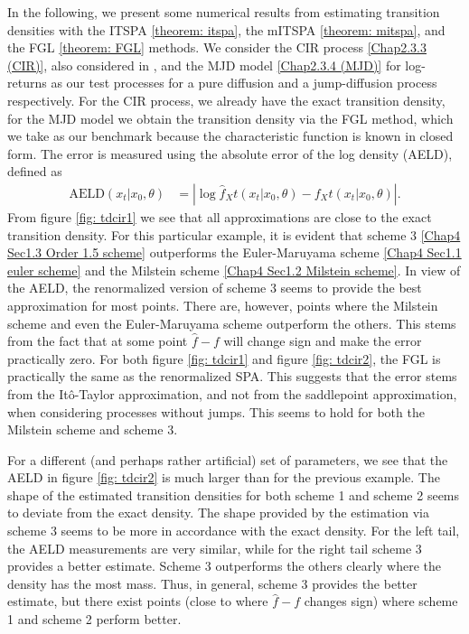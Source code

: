 In the following, we present some numerical results from estimating transition densities with the ITSPA \eqref{theorem: itspa}, the mITSPA \eqref{theorem: mitspa}, and the FGL \eqref{theorem: FGL} methods.
We consider the CIR process \eqref{Chap2.3.3 (CIR)}, also considered in \citet{preston2012approximation}, and the MJD model \eqref{Chap2.3.4 (MJD)} for log-returns as our test processes for a pure diffusion and a jump-diffusion process respectively.
For the CIR process, we already have the exact transition density, for the MJD model we obtain the transition density via the FGL method, which we take as our benchmark because the characteristic function is known in closed form.
The error is measured using the absolute error of the log density (AELD), defined as
\begin{align}
\text{AELD}(x_t|x_0,\theta)&=\left|\log\hat{f}_X{t}(x_t|x_0,\theta)-f_X{t}(x_t|x_0,\theta)\right|.
\end{align}
From figure %
\ref{fig: tdcir1}
we see that all approximations are close to the exact transition density.
For this particular example, it is evident that scheme 3 \eqref{Chap4 Sec1.3 Order 1.5 scheme} outperforms the Euler-Maruyama scheme \eqref{Chap4 Sec1.1 euler scheme} and the Milstein scheme \eqref{Chap4 Sec1.2 Milstein scheme}.
In view of the AELD, the renormalized version of scheme 3 seems to provide the best approximation for most points.
There are, however, points where the Milstein scheme and even the Euler-Maruyama scheme outperform the others.
This stems from the fact that at some point $\hat{f}-f$ will change sign and make the error practically zero.
For both figure \ref{fig: tdcir1} and figure \ref{fig: tdcir2}, the FGL is practically the same as the renormalized SPA.
This suggests that the error stems from the Itô-Taylor approximation, and not from the saddlepoint approximation, when considering processes without jumps.
This seems to hold for both the Milstein scheme and scheme 3.

For a different (and perhaps rather artificial) set of parameters, we see that the AELD in figure %
\ref{fig: tdcir2}
is much larger than for the previous example.
The shape of the estimated transition densities for both scheme 1 and scheme 2 seems to deviate from the exact density.
The shape provided by the estimation via scheme 3 seems to be more in accordance with the exact density.
For the left tail, the AELD measurements are very similar, while for the right tail scheme 3 provides a better estimate.
Scheme 3 outperforms the others clearly where the density has the most mass.
Thus, in general, scheme 3 provides the better estimate, but there exist points (close to where $\hat{f}-f$ changes sign) where scheme 1 and scheme 2 perform better.

